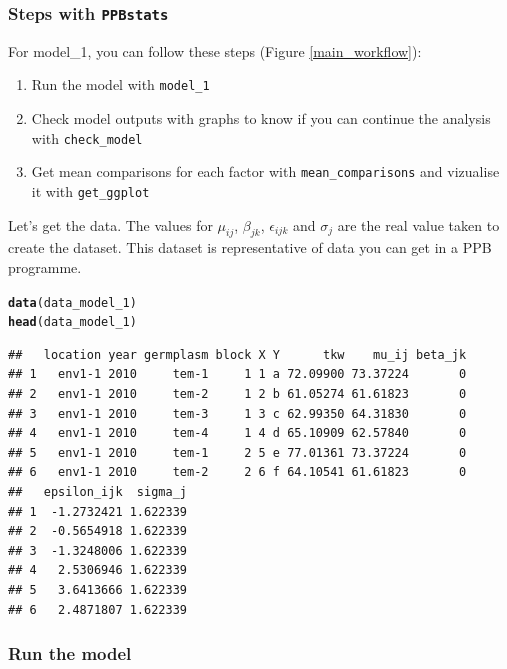 \documentclass{book}\usepackage[]{graphicx}\usepackage[]{color}
\makeatletter
\newcommand{\hlstd}[1]{\textcolor[rgb]{0.345,0.345,0.345}{#1}}%
\newcommand{\hlkwd}[1]{\textcolor[rgb]{0.737,0.353,0.396}{\textbf{#1}}}%
\newenvironment{kframe}{%
 \def\at@end@of@kframe{}%
 \ifinner\ifhmode%
  \def\at@end@of@kframe{\end{minipage}}%
  \begin{minipage}{\columnwidth}%
 \fi\fi%
 \def\FrameCommand##1{\hskip\@totalleftmargin \hskip-\fboxsep
 \colorbox{shadecolor}{##1}\hskip-\fboxsep
     \hskip-\linewidth \hskip-\@totalleftmargin \hskip\columnwidth}%
 \MakeFramed {\advance\hsize-\width
   \@totalleftmargin\z@ \linewidth\hsize
   \@setminipage}}%
 {\par\unskip\endMakeFramed%
 \at@end@of@kframe}
\newenvironment{knitrout}{}{} %
\newcommand{\pack}{\texttt{PPBstats}}
\makeatother
\begin{document}
\subsubsection{Steps with \pack}

For model\_1, you can follow these steps (Figure \ref{main_workflow}):

\begin{enumerate}
\item Run the model with \texttt{model\_1}
\item Check model outputs with graphs to know if you can continue the analysis with \texttt{check\_model}
\item Get mean comparisons for each factor with \texttt{mean\_comparisons} and vizualise it with \texttt{get\_ggplot}
\end{enumerate}

Let's get the data.
The values for $\mu_{ij}$, $\beta_{jk}$, $\epsilon_{ijk}$ and $\sigma_j$ are the real value taken to create the dataset.
This dataset is representative of data you can get in a PPB programme.

\begin{knitrout}
\color{fgcolor}\begin{kframe}
\begin{alltt}
\hlkwd{data}\hlstd{(data_model_1)}
\hlkwd{head}\hlstd{(data_model_1)}
\end{alltt}
\begin{verbatim}
##   location year germplasm block X Y      tkw    mu_ij beta_jk
## 1   env1-1 2010     tem-1     1 1 a 72.09900 73.37224       0
## 2   env1-1 2010     tem-2     1 2 b 61.05274 61.61823       0
## 3   env1-1 2010     tem-3     1 3 c 62.99350 64.31830       0
## 4   env1-1 2010     tem-4     1 4 d 65.10909 62.57840       0
## 5   env1-1 2010     tem-1     2 5 e 77.01361 73.37224       0
## 6   env1-1 2010     tem-2     2 6 f 64.10541 61.61823       0
##   epsilon_ijk  sigma_j
## 1  -1.2732421 1.622339
## 2  -0.5654918 1.622339
## 3  -1.3248006 1.622339
## 4   2.5306946 1.622339
## 5   3.6413666 1.622339
## 6   2.4871807 1.622339
\end{verbatim}
\end{kframe}
\end{knitrout}

\subsubsection{Run the model}
\end{document}
